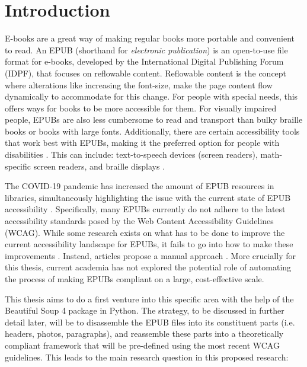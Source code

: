 \section{Introduction}
\label{sec:introduction}
E-books are a great way of making regular books more portable and convenient to read. An EPUB (shorthand for \textit{electronic publication}) is an open-to-use file format for e-books, developed by the International Digital Publishing Forum (IDPF), that focuses on reflowable content. Reflowable content is the concept where alterations like increasing the font-size, make the page content flow dynamically to accommodate for this change. For people with special needs, this offers ways for books to be more accessible for them. For visually impaired people, EPUBs are also less cumbersome to read and transport than bulky braille books or books with large fonts. Additionally, there are certain accessibility tools that work best with EPUBs, making it the preferred option for people with disabilities \cite{Kasdorf2018}. This can include: text-to-speech devices (screen readers), math-specific screen readers, and braille displays \cite{Giusti2016, Kasdorf2018, Kim2019}. 

The COVID-19 pandemic has increased the amount of EPUB resources in libraries, simultaneously highlighting the issue with the current state of EPUB accessibility \cite{Chee2022}. Specifically, many EPUBs currently do not adhere to the latest accessibility standards posed by the Web Content Accessibility Guidelines (WCAG). While some research exists on what has to be done to improve the current accessibility landscape for EPUBs, it fails to go into how to make these improvements \cite{Chee2022}. Instead, articles propose a manual approach \cite{Campoverde2020}. More crucially for this thesis, current academia has not explored the potential role of automating the process of making EPUBs compliant on a large, cost-effective scale. 

This thesis aims to do a first venture into this specific area with the help of the Beautiful Soup 4 package in Python. The strategy, to be discussed in further detail later, will be to disassemble the EPUB files into its constituent parts (i.e. headers, photos, paragraphs), and reassemble these parts into a theoretically compliant framework that will be pre-defined using the most recent WCAG guidelines. This leads to the main research question in this proposed research: \\

